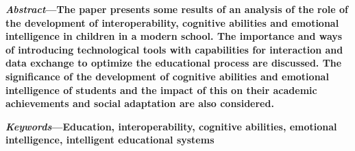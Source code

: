 \documentclass{article}
\begin{document}
\newpage
\maketitle
\begin{multicols}{2}
\fontsize{8pt}{9pt}\selectfont
\textbf{\textit{Abstract}—The paper presents some results of an analysis
of the role of the development of interoperability, cognitive abilities and emotional intelligence in children in a
modern school. The importance and ways of introducing
technological tools with capabilities for interaction and data
exchange to optimize the educational process are discussed.
The significance of the development of cognitive abilities
and emotional intelligence of students and the impact of
this on their academic achievements and social adaptation
are also considered.}
\par \textbf{\textit{Keywords}—Education, interoperability, cognitive abilities,
emotional intelligence, intelligent educational systems} \par
\fontsize{10pt}{12pt}\selectfont
\vspace{-1.5em}

\end{multicols}
\end{document}
